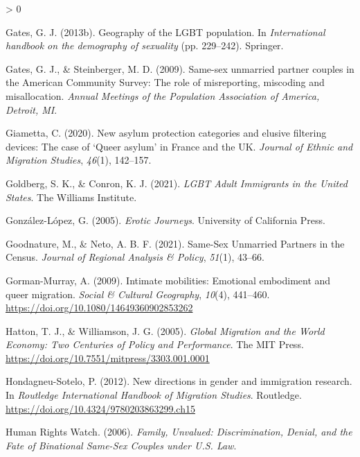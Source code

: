 \documentclass[
  11pt,
]{article}
\newlength{\cslhangindent}
\newenvironment{CSLReferences}[2] %
 {%
  \setlength{\parindent}{0pt}
  \ifodd #1 \everypar{\setlength{\hangindent}{\cslhangindent}}\ignorespaces\fi
  \ifnum #2 > 0
  \setlength{\parskip}{#2\baselineskip}
  \fi
 }%
 {}
\begin{document}
\begin{CSLReferences}{1}{0}
\leavevmode\hypertarget{ref-gates_2013a}{}%
Gates, G. J. (2013b). Geography of the {LGBT} population. In \emph{International handbook on the demography of sexuality} (pp. 229--242). {Springer}.

\leavevmode\hypertarget{ref-gates_2009}{}%
Gates, G. J., \& Steinberger, M. D. (2009). Same-sex unmarried partner couples in the {American Community Survey}: {The} role of misreporting, miscoding and misallocation. \emph{Annual Meetings of the Population Association of America, Detroit, {MI}}.

\leavevmode\hypertarget{ref-giametta_2020}{}%
Giametta, C. (2020). New asylum protection categories and elusive filtering devices: The case of {`{Queer} asylum'} in {France} and the {UK}. \emph{Journal of Ethnic and Migration Studies}, \emph{46}(1), 142--157.

\leavevmode\hypertarget{ref-goldberg_2021}{}%
Goldberg, S. K., \& Conron, K. J. (2021). \emph{{LGBT Adult Immigrants} in the {United States}}. {The Williams Institute}.

\leavevmode\hypertarget{ref-gonzalez-lopez_2005}{}%
González-López, G. (2005). \emph{Erotic {Journeys}}. {University of California Press}.

\leavevmode\hypertarget{ref-goodnature_2021}{}%
Goodnature, M., \& Neto, A. B. F. (2021). Same-{Sex Unmarried Partners} in the {Census}. \emph{Journal of Regional Analysis \& Policy}, \emph{51}(1), 43--66.

\leavevmode\hypertarget{ref-gorman-murray_2009}{}%
Gorman-Murray, A. (2009). Intimate mobilities: Emotional embodiment and queer migration. \emph{Social \& Cultural Geography}, \emph{10}(4), 441--460. \url{https://doi.org/10.1080/14649360902853262}

\leavevmode\hypertarget{ref-hatton_2005a}{}%
Hatton, T. J., \& Williamson, J. G. (2005). \emph{Global {Migration} and the {World Economy}: {Two Centuries} of {Policy} and {Performance}}. {The MIT Press}. \url{https://doi.org/10.7551/mitpress/3303.001.0001}

\leavevmode\hypertarget{ref-hondagneu-sotelo_2012}{}%
Hondagneu-Sotelo, P. (2012). New directions in gender and immigration research. In \emph{Routledge {International Handbook} of {Migration Studies}}. {Routledge}. \url{https://doi.org/10.4324/9780203863299.ch15}

\leavevmode\hypertarget{ref-humanrightswatch_2006}{}%
Human Rights Watch. (2006). \emph{Family, {Unvalued}: {Discrimination}, {Denial}, and the {Fate} of {Binational Same}-{Sex Couples} under {U}.{S}. {Law}}.


\end{CSLReferences}
\end{document}
